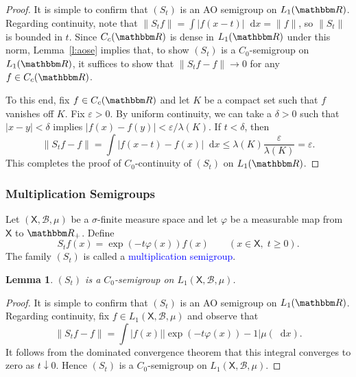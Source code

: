 \documentclass[12pt, reqno]{amsart}
\renewcommand{\leq}{\leqslant}
\renewcommand{\geq}{\geqslant}
\newcommand{\1}{\mathbbm 1}
\newcommand*\diff{\mathop{}\!\mathrm{d}}
\newcommand{\bB}{\mathcal B}
\newcommand{\RR}{\mathbbm R}
\newcommand{\Xsf}{\mathsf X}
\renewcommand{\phi}{\varphi}
\renewcommand{\epsilon}{\varepsilon}
\theoremstyle{plain}
\newtheorem{lemma}[theorem]{Lemma}
\theoremstyle{definition}
\newcommand{\navy}[1]{\textcolor{blue}{#1}}
\begin{document}
\begin{proof}
    It is simple to confirm that $(S_t)$ is an AO semigroup on $L_1(\RR)$.
    Regarding continuity, note that $\|S_t f\| = \int |f(x-t)| \diff x = \| f\|$, so
    $\|S_t\|$ is bounded in $t$.  Since $C_c(\RR)$ is dense in $L_1(\RR)$ under this
    norm, Lemma~\ref{l:aose} implies that, to show $(S_t)$ is a $C_0$-semigroup
    on $L_1(\RR)$, it suffices to show that $\| S_t f - f \| \to 0$ for any $f \in
    C_c(\RR)$.

    To this end, fix $f \in C_c(\RR)$ and let $K$ be a compact set such that $f$
    vanishes off $K$.  Fix $\epsilon > 0$.  By uniform continuity, we can take a
    $\delta > 0$ such that $|x-y| < \delta$ implies $|f(x) - f(y)| < \epsilon /
    \lambda(K)$.  If $t < \delta$, then
    \begin{equation*}
        \| S_t f - f \| 
        = \int | f(x-t) - f(x) | \diff x
        \leq \lambda(K) \frac{\epsilon}{\lambda(K)} = \epsilon.
    \end{equation*}
    This completes the proof of $C_0$-continuity of $(S_t)$ on $L_1(\RR)$.
\end{proof}


\subsubsection{Multiplication Semigroups}\label{ss:multisemi}

Let $(\Xsf, \bB, \mu)$ be a $\sigma$-finite measure space and let
$\phi$ be a measurable map from $\Xsf$ to $\RR_+$.  Define
%
\begin{equation*}
    S_t f (x)= \exp(-t \phi(x)) f(x) 
    \qquad (x \in \Xsf, \; t \geq 0).
\end{equation*}
%
The family $(S_t)$ is called a \navy{multiplication semigroup}.

\begin{lemma}\label{l:multisemi}
    $(S_t)$ is a $C_0$-semigroup on $L_1(\Xsf, \bB, \mu)$.
\end{lemma}

\begin{proof}
    It is simple to confirm that $(S_t)$ is an AO semigroup on $L_1(\RR)$.
    Regarding continuity, fix $f \in L_1(\Xsf, \bB, \mu)$ and observe that
    \begin{equation*}
        \| S_t f - f \|
        = \int |f(x)| | \exp(-t\phi(x)) - 1 | \mu(\diff x).
    \end{equation*}
    It follows from the dominated convergence theorem that this integral
    converges to zero as $t \downarrow 0$.  Hence $(S_t)$ is a $C_0$-semigroup
    on $L_1(\Xsf, \bB, \mu)$.
\end{proof}
\end{document}
